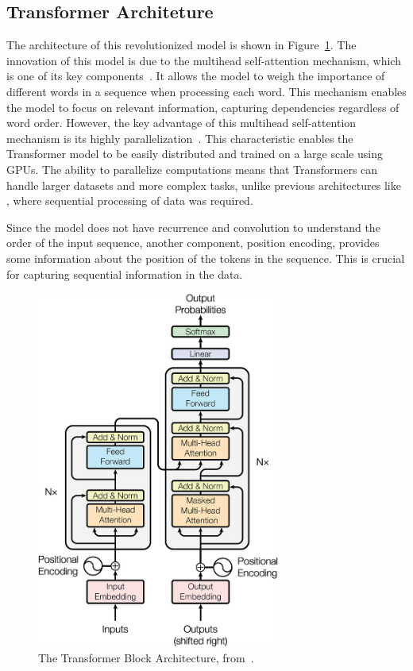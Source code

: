 \subsection{Transformer Architeture}

The architecture of this revolutionized model is shown in Figure~\ref{fig_trans_arch}. The innovation of this model is due to the multihead self-attention mechanism, which is one of its key components~\cite{vaswani_attention_2023, hadi_LLM_2023}. It allows the model to weigh the importance of different words in a sequence when processing each word. This mechanism enables the model to focus on relevant information, capturing dependencies regardless of word order. However, the key advantage of this multihead self-attention mechanism is its highly parallelization~\cite{vaswani_attention_2023}. This characteristic enables the Transformer model to be easily distributed and trained on a large scale using GPUs. The ability to parallelize computations means that Transformers can handle larger datasets and more complex tasks, unlike previous architectures like {\rnn}, where sequential processing of data was required.

Since the model does not have recurrence and convolution to understand the order of the input sequence, another component, position encoding, provides some information about the position of the tokens in the sequence. This is crucial for capturing sequential information in the data. 

\begin{figure}[ht]
    \includegraphics[width=8cm]{figs/chapter2/transformer.png}
    \centering
    \caption[The Transformer Block Architecture]{The Transformer Block Architecture, from~\citet{vaswani_attention_2023}.}
    \label{fig_trans_arch}
\end{figure}


